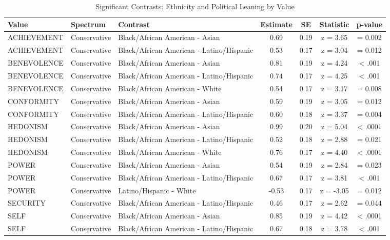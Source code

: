 \begin{table}[t]
\caption*{
{\large Significant Contrasts: Ethnicity and Political Leaning by Value}
} 
\fontsize{9.0pt}{10.8pt}\selectfont
\begin{tabular*}{\linewidth}{@{\extracolsep{\fill}}lllcccc}
\toprule
Value & Spectrum & Contrast & Estimate & SE & Statistic & p-value \\ 
\midrule\addlinespace[2.5pt]
ACHIEVEMENT & Conservative & Black/African American - Asian & 0.69 & 0.19 & z = 3.65 & = 0.002 \\ 
ACHIEVEMENT & Conservative & Black/African American - Latino/Hispanic & 0.53 & 0.17 & z = 3.04 & = 0.012 \\ 
BENEVOLENCE & Conservative & Black/African American - Asian & 0.81 & 0.19 & z = 4.24 & < .001 \\ 
BENEVOLENCE & Conservative & Black/African American - Latino/Hispanic & 0.74 & 0.17 & z = 4.25 & < .001 \\ 
BENEVOLENCE & Conservative & Black/African American - White & 0.54 & 0.17 & z = 3.17 & = 0.008 \\ 
CONFORMITY & Conservative & Black/African American - Asian & 0.59 & 0.19 & z = 3.05 & = 0.012 \\ 
CONFORMITY & Conservative & Black/African American - Latino/Hispanic & 0.60 & 0.18 & z = 3.37 & = 0.004 \\ 
HEDONISM & Conservative & Black/African American - Asian & 0.99 & 0.20 & z = 5.04 & < .0001 \\ 
HEDONISM & Conservative & Black/African American - Latino/Hispanic & 0.52 & 0.18 & z = 2.88 & = 0.021 \\ 
HEDONISM & Conservative & Black/African American - White & 0.76 & 0.17 & z = 4.40 & < .0001 \\ 
POWER & Conservative & Black/African American - Asian & 0.54 & 0.19 & z = 2.84 & = 0.023 \\ 
POWER & Conservative & Black/African American - Latino/Hispanic & 0.67 & 0.17 & z = 3.81 & < .001 \\ 
POWER & Conservative & Latino/Hispanic - White & -0.53 & 0.17 & z = -3.05 & = 0.012 \\ 
SECURITY & Conservative & Black/African American - Latino/Hispanic & 0.46 & 0.17 & z = 2.62 & = 0.044 \\ 
SELF & Conservative & Black/African American - Asian & 0.85 & 0.19 & z = 4.42 & < .0001 \\ 
SELF & Conservative & Black/African American - Latino/Hispanic & 0.67 & 0.18 & z = 3.78 & < .001 \\ 

\end{tabular*}
\end{table}
